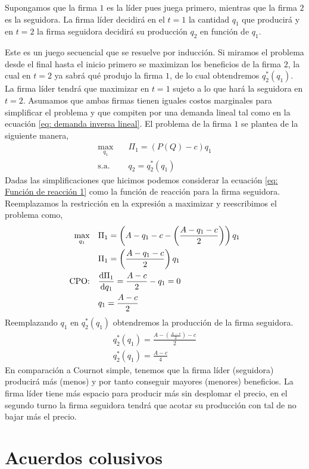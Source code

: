 Supongamos que la firma $1$ es la líder pues juega primero, mientras que la firma $2$ es la seguidora. La firma líder decidirá en el $t = 1$ la cantidad $q_1$ que producirá y en $t=2$ la firma seguidora decidirá su producción $q_2$ en función de $q_1$.

Este es un juego secuencial que se resuelve por inducción. Si miramos el problema desde el final hasta el inicio primero se maximizan los beneficios de la firma $2$, la cual en $t = 2$ ya sabrá qué produjo la firma $1$, de lo cual obtendremos $q_2^*(q_1)$. La firma líder tendrá que maximizar en $t=1$ sujeto a lo que hará la seguidora en $t=2$. Asumamos que ambas firmas tienen iguales costos marginales para simplificar el problema y que compiten por una demanda lineal tal como en la ecuación \ref{eq: demanda inversa lineal}. El problema de la firma $1$ se plantea de la siguiente manera,
\begin{align*}
    \max_{q_1} \quad &\Pi_1 = (P(Q)-c)q_1 \\
    \text{s.a.}\quad &q_2=q_2^*(q_1)
\end{align*}
Dadas las simplificaciones que hicimos podemos considerar la ecuación \ref{eq: Función de reacción 1} como la función de reacción para la firma seguidora. Reemplazamos la restricción en la expresión a maximizar y reescribimos el problema como,
\begin{align*}
    \max_{q_1} \quad &\Pi_1 = \left(A-q_1-c- \left(\frac{A-q_1-c}{2} \right) \right)q_1 \\ & \Pi_1 = \left( \frac{A-q_1-c}{2}   \right)q_1 \\
    \text{CPO:} \quad & \dv{\Pi_1}{q_1} =   \frac{A-c}{2} -q_1 = 0 \\
    & q_1 = \frac{A-c}{2}
\end{align*}
Reemplazando $q_1$ en $q_2^*(q_1)$ obtendremos la producción de la firma seguidora. 
\begin{align*}
    q_2^*(q_1) = \frac{A-(\frac{A-c}{2})-c}{2} \\
    q_2^*(q_1) = \frac{A-c}{4}
\end{align*}
En comparación a Cournot simple, tenemos que la firma líder (seguidora) producirá más (menos) y por tanto conseguir mayores (menores) beneficios. La firma líder tiene más espacio para producir más sin desplomar el precio, en el segundo turno la firma seguidora tendrá que acotar su producción con tal de no bajar más el precio.

\section{Acuerdos colusivos}

